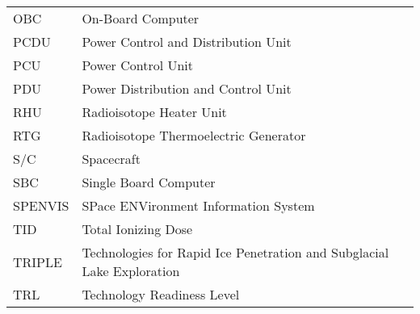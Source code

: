\begin{longtable}[l]{ll}
OBC		& On-Board Computer \\
PCDU    & Power Control and Distribution Unit \\
PCU     & Power Control Unit \\
PDU     & Power Distribution and Control Unit \\
RHU		& Radioisotope Heater Unit\\
RTG     & Radioisotope Thermoelectric Generator \\
S/C     & Spacecraft\\
SBC		& Single Board Computer \\
SPENVIS	&	SPace ENVironment Information System	\\
TID		& Total Ionizing Dose \\
TRIPLE 	& Technologies for Rapid Ice Penetration and Subglacial Lake Exploration \\
TRL     & Technology Readiness Level \\



\end{longtable}

\cleardoublepage






